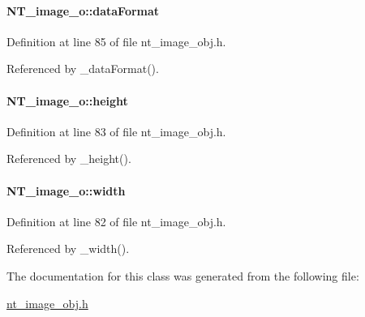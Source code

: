 \paragraph[{dataFormat}]{ {\bf NT\_\-image\_\-o::dataFormat}}\hfill\label{class_n_t__image__o_ab497908a0ca93b8a0ab6dc927fa7679c}


Definition at line 85 of file nt\_\-image\_\-obj.h.



Referenced by \_\-dataFormat().

\paragraph[{height}]{ {\bf NT\_\-image\_\-o::height}}\hfill\label{class_n_t__image__o_a025b7e7250470e53dbf69ba10c013284}


Definition at line 83 of file nt\_\-image\_\-obj.h.



Referenced by \_\-height().

\paragraph[{width}]{ {\bf NT\_\-image\_\-o::width}}\hfill\label{class_n_t__image__o_af1a2f06cb8db6d36520e72df08c133d0}


Definition at line 82 of file nt\_\-image\_\-obj.h.



Referenced by \_\-width().



The documentation for this class was generated from the following file:\begin{DoxyCompactItemize}
\item 
\hyperlink{nt__image__obj_8h}{nt\_\-image\_\-obj.h}\end{DoxyCompactItemize}
